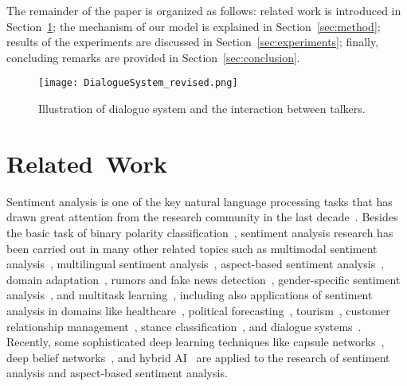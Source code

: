 \documentclass[journal]{IEEEtran}
\begin{document}
The remainder of the paper is organized as follows: related work is introduced in Section~\ref{sec:related}; the mechanism of our model is explained in Section~\ref{sec:method}; results of the experiments are discussed in Section~\ref{sec:experiments}; finally, concluding remarks are provided in Section~\ref{sec:conclusion}.

\begin{figure}[t]
\centering\texttt{[image: DialogueSystem\_revised.png]}
\caption{Illustration of dialogue system and the interaction between talkers.}
\label{fig:DialogueSystem}
\end{figure}

\section{Related~Work}
\label{sec:related}
Sentiment analysis is one of the key natural language processing tasks that has drawn great attention from the research community in the last decade~\cite{cambig}. Besides the basic task of binary polarity classification~\cite{zhu2020sentivec}, sentiment analysis research has been carried out in many other related topics such as multimodal sentiment analysis~\cite{zadmul,ragima}, multilingual sentiment analysis~\cite{esucro}, aspect-based sentiment analysis~\cite{weiasp}, domain adaptation~\cite{banlex,xuuins}, rumors and fake news detection~\cite{akhnoo,reisup}, gender-specific sentiment analysis~\cite{mihwha,buktyp}, and multitask learning~\cite{yanseg}, including also applications of sentiment analysis in domains like healthcare~\cite{mahdet,qurmul}, political forecasting~\cite{ebrcha}, tourism~\cite{valsen}, customer relationship management~\cite{biicro}, stance classification~\cite{duucom}, and dialogue systems~\cite{wellea,schint}. Recently, some sophisticated deep learning techniques like capsule networks~\cite{zhang2020knowledge}, deep belief networks~\cite{liu2021speech}, and hybrid AI~\cite{camnt6} are applied to the research of sentiment analysis and aspect-based sentiment analysis.
\end{document}
